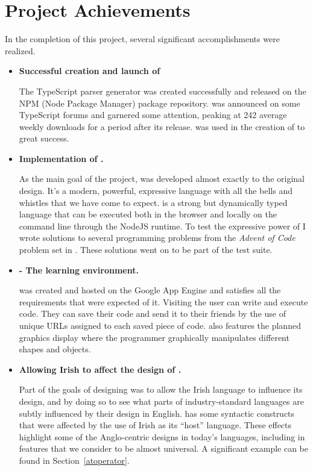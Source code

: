 \section{Project Achievements}
In the completion of this project, several significant accomplishments were realized.
\begin{itemize}
    \item \textbf{Successful creation and launch of \tsPEG{}}

        The TypeScript parser generator \tsPEG{} was created successfully and released on the NPM (Node Package Manager) package repository. \tsPEG{} was announced on some TypeScript forums and garnered some attention, peaking at 242 average weekly downloads for a period after its release. \tsPEG{} was used in the creation of \Setanta{} to great success.

    \item \textbf{Implementation of \Setanta{}.}

        As the main goal of the project, \Setanta{} was developed almost exactly to the original design. It's a modern, powerful, expressive language with all the bells and whistles that we have come to expect. \Setanta{} is a strong but dynamically typed language that can be executed both in the browser and locally on the command line through the NodeJS runtime. To test the expressive power of \Setanta{} I wrote solutions to several programming problems from the \emph{Advent of Code} problem set in \Setanta{}. These solutions went on to be part of the test suite.

    \item \textbf{\trys{} - The \Setanta{} learning environment.}

        \trys{} was created and hosted on the Google App Engine and satisfies all the requirements that were expected of it. Visiting \trys{} the user can write and execute \Setanta{} code. They can save their code and send it to their friends by the use of unique URLs assigned to each saved piece of code. \trys{} also features the planned graphics display where the programmer graphically manipulates different shapes and objects.

    \item \textbf{Allowing Irish to affect the design of \Setanta{}.}

        Part of the goals of designing \Setanta{} was to allow the Irish language to influence its design, and by doing so to see what parts of industry-standard languages are subtly influenced by their design in English. \Setanta{} has some syntactic constructs that were affected by the use of Irish as its ``host'' language. These effects highlight some of the Anglo-centric designs in today's languages, including in features that we consider to be almost universal. A significant example can be found in Section~\ref{atoperator}.


\end{itemize}
